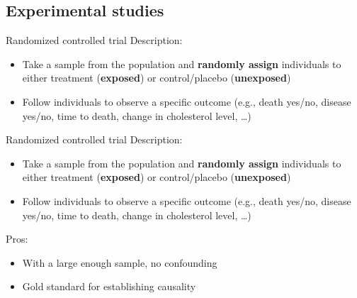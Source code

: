 \documentclass[10pt,t]{beamer}
\begin{document}
\subsection{Experimental studies}

\begin{frame}{Randomized controlled trial}
Description:
\begin{itemize}
	\item Take a sample from the population and \textbf{randomly assign} individuals to either treatment (\textbf{exposed}) or control/placebo (\textbf{unexposed})
	\item Follow individuals to observe a specific outcome (e.g., death yes/no, disease yes/no, time to death, change in cholesterol level, \dots)
\end{itemize}
\end{frame}

\begin{frame}{Randomized controlled trial}
Description:
\begin{itemize}
	\item Take a sample from the population and \textbf{randomly assign} individuals to either treatment (\textbf{exposed}) or control/placebo (\textbf{unexposed})
	\item Follow individuals to observe a specific outcome (e.g., death yes/no, disease yes/no, time to death, change in cholesterol level, \dots)
\end{itemize}
Pros:
\begin{itemize}
	\item With a large enough sample, no confounding
	\item Gold standard for establishing causality
\end{itemize}
\end{frame}
\end{document}
